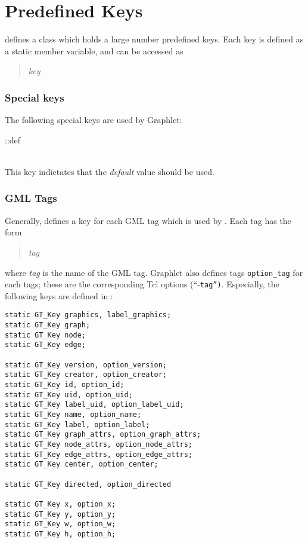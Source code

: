 \documentclass[twoside,fleqn]{report}
\begin{document}
%
%

\section{Predefined Keys}
\label{s:PredefinedKeys}


\noindent \Graphlet{} defines a class  which holds a large
number predefined keys.  Each key is defined as a static member
variable, and can be accessed as

\begin{quote}
  \emph{key}
\end{quote}


%
%

\subsubsection{Special keys}

The following special keys are used by Graphlet:

\begin{ttdescription}
\item[\GT{Key} \GT{Keys}::def] \strut\\
This key indictates that the \emph{default} value should be used.
\end{ttdescription}


%
%

\subsubsection{GML Tags}

Generally, \Graphlet{} defines a key for each GML tag which is
used by \Graphlet{}.  Each tag has the form

\begin{quote}
  \emph{tag}
\end{quote}

\noindent where \emph{tag} is the name of the GML tag.
Graphlet also defines tags \texttt{option\_tag} for each tags;
these are the corresponding Tcl options (``-\texttt{tag'')}.
Especially, the following keys are defined in :

\begin{verbatim}
static GT_Key graphics, label_graphics;
static GT_Key graph;
static GT_Key node;
static GT_Key edge;

static GT_Key version, option_version;
static GT_Key creator, option_creator;
static GT_Key id, option_id;
static GT_Key uid, option_uid;
static GT_Key label_uid, option_label_uid;
static GT_Key name, option_name;
static GT_Key label, option_label;
static GT_Key graph_attrs, option_graph_attrs;
static GT_Key node_attrs, option_node_attrs;
static GT_Key edge_attrs, option_edge_attrs;
static GT_Key center, option_center;

static GT_Key directed, option_directed

static GT_Key x, option_x;
static GT_Key y, option_y;
static GT_Key w, option_w;
static GT_Key h, option_h;
\end{verbatim}
\end{document}
